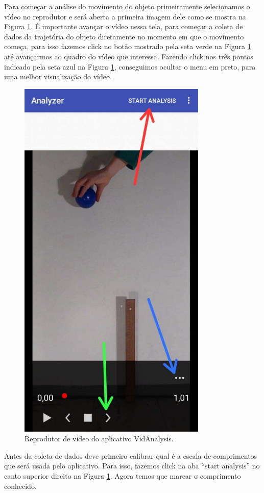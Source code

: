 \documentclass[12pt]{article}
\begin{document}
Para começar a análise do movimento do objeto primeiramente  
selecionamos o vídeo no reprodutor e será aberta a primeira imagem dele como se mostra na Figura \ref{apendice2c}. É importante avançar o vídeo nessa tela, para começar a coleta de dados da trajetória do objeto diretamente no momento em que o movimento  começa, para isso fazemos click no botão mostrado pela seta verde na Figura \ref{apendice2c} até avançarmos ao quadro do vídeo que interessa. Fazendo click nos três pontos indicado pela seta azul na Figura \ref{apendice2c}, conseguimos ocultar o menu em preto, para uma melhor visualização do vídeo.
\begin{figure}[h!]
\includegraphics[width=9cm]{imagenapendicec2.pdf}
\caption{Reprodutor de video do aplicativo VidAnalysis.}
\label{apendice2c}
\end{figure}
Antes da coleta de dados deve primeiro calibrar qual é a escala de comprimentos que será usada pelo aplicativo. Para isso, fazemos click na aba ``start analysis''  no canto superior direito na Figura \ref{apendice2c}. Agora temos que marcar o comprimento conhecido.
\end{document}
